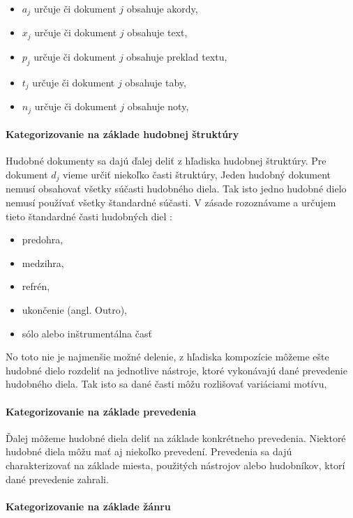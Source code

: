 \begin{itemize}
\item{\(a_j\) určuje či dokument \(j\) obsahuje akordy,}
\item{\(x_j\) určuje či dokument \(j\) obsahuje text,}
\item{\(p_j\) určuje či dokument \(j\) obsahuje preklad textu,}
\item{\(t_j\) určuje či dokument \(j\) obsahuje taby,}
\item{\(n_j\) určuje či dokument \(j\) obsahuje noty,}
\end{itemize}

\paragraph{Kategorizovanie na základe hudobnej štruktúry}

Hudobné dokumenty sa dajú ďalej deliť z hľadiska hudobnej štruktúry. Pre dokument \(d_j\) vieme určiť niekoľko časti štruktúry, Jeden hudobný dokument nemusí obsahovať všetky súčasti hudobného diela. Tak isto jedno hudobné dielo nemusí používať všetky štandardné súčasti. V zásade rozoznávame a určujem tieto štandardné časti hudobných diel \cite{1}:

\begin{itemize}
\item{predohra,}
\item{medzihra,}
\item{refrén,}
\item{ukončenie (angl. Outro),}
\item{sólo alebo inštrumentálna časť}
\end{itemize}

No toto nie je najmenšie možné delenie, z hľadiska kompozície môžeme ešte hudobné dielo rozdeliť na jednotlive nástroje, ktoré vykonávajú dané prevedenie hudobného diela. Tak isto sa dané časti môžu rozlišovať variáciami motívu\cite{12},

\paragraph{Kategorizovanie na základe prevedenia}

Ďalej môžeme hudobné diela deliť na základe konkrétneho prevedenia. Niektoré hudobné diela môžu mať aj niekoľko prevedení. Prevedenia sa dajú charakterizovať na základe miesta, použitých nástrojov alebo hudobníkov, ktorí dané prevedenie zahrali.

\paragraph{Kategorizovanie na základe žánru}

